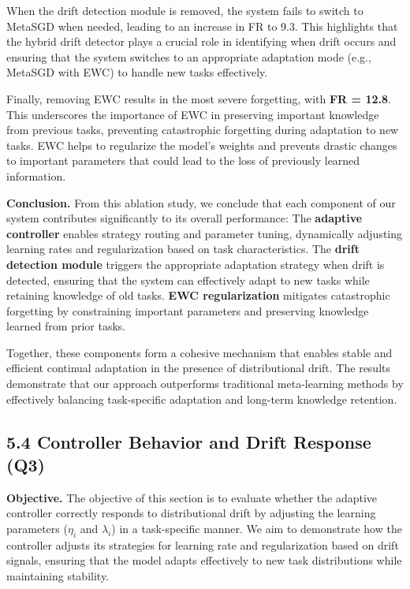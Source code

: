 \documentclass[conference]{IEEEtran}
\begin{document}
When the drift detection module is removed, the system fails to switch to MetaSGD when needed, leading to an increase in FR to 9.3. This highlights that the hybrid drift detector plays a crucial role in identifying when drift occurs and ensuring that the system switches to an appropriate adaptation mode (e.g., MetaSGD with EWC) to handle new tasks effectively.

Finally, removing EWC results in the most severe forgetting, with \textbf{FR = 12.8}. This underscores the importance of EWC in preserving important knowledge from previous tasks, preventing catastrophic forgetting during adaptation to new tasks. EWC helps to regularize the model's weights and prevents drastic changes to important parameters that could lead to the loss of previously learned information.

\textbf{Conclusion.}  
From this ablation study, we conclude that each component of our system contributes significantly to its overall performance:
 The \textbf{adaptive controller} enables strategy routing and parameter tuning, dynamically adjusting learning rates and regularization based on task characteristics.
 The \textbf{drift detection module} triggers the appropriate adaptation strategy when drift is detected, ensuring that the system can effectively adapt to new tasks while retaining knowledge of old tasks.
 \textbf{EWC regularization} mitigates catastrophic forgetting by constraining important parameters and preserving knowledge learned from prior tasks.

Together, these components form a cohesive mechanism that enables stable and efficient continual adaptation in the presence of distributional drift. The results demonstrate that our approach outperforms traditional meta-learning methods by effectively balancing task-specific adaptation and long-term knowledge retention.


\subsection{5.4 Controller Behavior and Drift Response (Q3)}

\textbf{Objective.}  
The objective of this section is to evaluate whether the adaptive controller correctly responds to distributional drift by adjusting the learning parameters (\(\eta_i\) and \(\lambda_i\)) in a task-specific manner. We aim to demonstrate how the controller adjusts its strategies for learning rate and regularization based on drift signals, ensuring that the model adapts effectively to new task distributions while maintaining stability.
\end{document}
